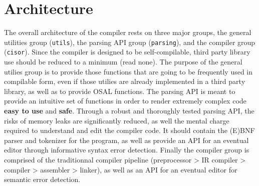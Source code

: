 \documentclass{article}
\begin{document}
\section{Architecture}
The overall architecture of the compiler rests on three major groups, the general utilities group (\texttt{utils}), the parsing API group (\texttt{parsing}), and the compiler group (\texttt{cisor}). Since the compiler is designed to be self-compilable, third party library use should be reduced to a minimum (read none). The purpose of the general utilies group is to provide those functions that are going to be frequently used in compilable form, even if those utilies are already implemented in a third party library, as well as to provide OSAL functions. The parsing API is meant to provide an intuitive set of functions in order to render extremely complex code \textbf{easy to use} and \textbf{safe}. Through a robust and thoroughly tested parsing API, the risks of memory leaks are significantly reduced, as well the mental charge required to understand and edit the compiler code. It should contain the (E)BNF parser and tokenizer for the program, as well as provide an API for an eventual editor through informative syntax error detection. Finally the compiler group is comprised of the traditionnal compiler pipeline (preprocessor > IR compiler > compiler > assembler > linker), as well as an API for an eventual editor for semantic error detection.
\end{document}
